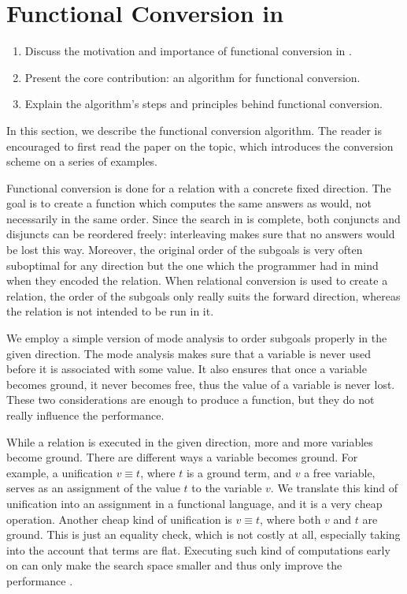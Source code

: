 \section{Functional Conversion in \mk}

\begin{enumerate}
    \item Discuss the motivation and importance of functional conversion in \mk.
    \item Present the core contribution: an algorithm for functional conversion.
    \item Explain the algorithm's steps and principles behind functional conversion.
\end{enumerate}

In this section, we describe the functional conversion algorithm. 
The reader is encouraged to first read the paper  on the topic, which introduces the conversion scheme on a series of examples.

Functional conversion is done for a relation with a concrete fixed direction. 
The goal is to create a function which computes the same answers as \mk would, not necessarily in the same order. 
Since the search in \mk is complete, both conjuncts and disjuncts can be reordered freely: interleaving makes sure that no answers would be lost this way. 
Moreover, the original order of the subgoals is very often suboptimal for any direction but the one which the programmer had in mind when they encoded the relation. 
When relational conversion is used to create a relation, the order of the subgoals only really suits the forward direction, whereas the relation is not intended to be run in it. 

We employ a simple version of mode analysis to order subgoals properly in the given direction. 
The mode analysis makes sure that a variable is never used before it is associated with some value. 
It also ensures that once a variable becomes ground, it never becomes free, thus the value of a variable is never lost. 
These two considerations are enough to produce a function, but they do not really influence the performance. 

While a relation is executed in the given direction, more and more variables become ground. 
There are different ways a variable becomes ground. 
For example, a unification $v \equiv t$, where $t$ is a ground term, and $v$ a free variable, serves as an assignment of the value $t$ to the variable $v$. 
We translate this kind of unification into an assignment in a functional language, and it is a very cheap operation. 
Another cheap kind of unification is $v \equiv t$, where both $v$ and $t$ are ground. 
This is just an equality check, which is not costly at all, especially taking into the account that terms are flat. 
Executing such kind of computations early on can only make the search space smaller and thus only improve the performance . 

